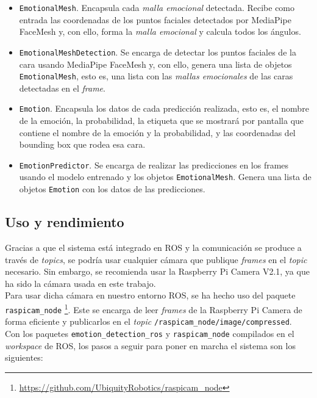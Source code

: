 \begin{itemize}
    \item \verb|EmotionalMesh|. Encapsula cada \textit{malla emocional} detectada. Recibe como entrada las coordenadas de los puntos faciales detectados por MediaPipe FaceMesh y, con ello, forma la \textit{malla emocional} y calcula todos los ángulos.
    
    \item \verb|EmotionalMeshDetection|. Se encarga de detectar los puntos faciales de la cara usando MediaPipe FaceMesh y, con ello, genera una lista de objetos \verb|EmotionalMesh|, esto es, una lista con las \textit{mallas emocionales} de las caras detectadas en el \textit{frame}.
    
    \item \verb|Emotion|. Encapsula los datos de cada predicción realizada, esto es, el nombre de la emoción, la probabilidad, la etiqueta que se mostrará por pantalla que contiene el nombre de la emoción y la probabilidad, y las coordenadas del bounding box que rodea esa cara.
    
    \item \verb|EmotionPredictor|. Se encarga de realizar las predicciones en los frames usando el modelo entrenado y los objetos \verb|EmotionalMesh|. Genera una lista de objetos \verb|Emotion| con los datos de las predicciones.
\end{itemize}

\subsection{Uso y rendimiento}
\label{sec:uso_rendimiento_ros}

Gracias a que el sistema está integrado en ROS y la comunicación se produce a través de \textit{topics}, se podría usar cualquier cámara que publique \textit{frames} en el \textit{topic} necesario. Sin embargo, se recomienda usar la Raspberry Pi Camera V2.1, ya que ha sido la cámara usada en este trabajo.\\

Para usar dicha cámara en nuestro entorno ROS, se ha hecho uso del paquete \verb|raspicam_node| \footnote{\url{https://github.com/UbiquityRobotics/raspicam_node}}. Este se encarga de leer \textit{frames} de la Raspberry Pi Camera de forma eficiente y publicarlos en el \textit{topic} \verb|/raspicam_node/image/compressed|.\\

Con los paquetes \verb|emotion_detection_ros| y \verb|raspicam_node| compilados en el \textit{workspace} de ROS, los pasos a seguir para poner en marcha el sistema son los siguientes:

